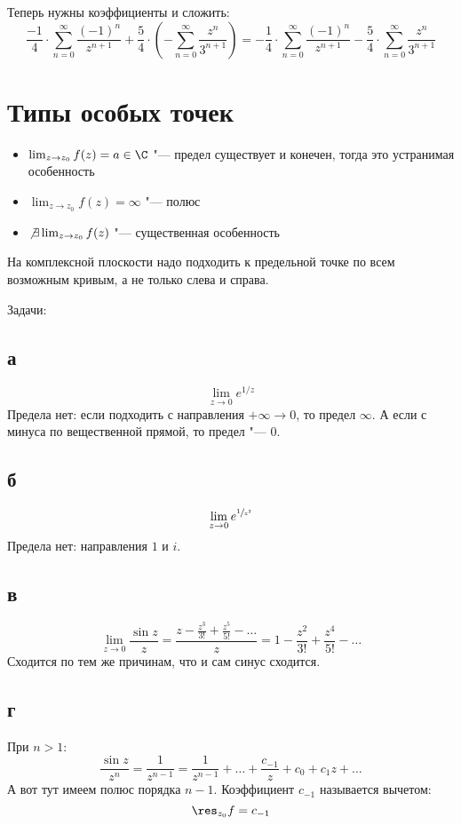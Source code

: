 	Теперь нужны коэффициенты и сложить:
	\[
		\frac{-1}{4} \cdot \sum_{n=0}^\infty \frac{(-1)^n}{z^{n+1}}
		+
		\frac{5}{4} \cdot \left(-\sum_{n=0}^\infty \frac{z^n}{3^{n+1}}\right) =
		- \frac{1}{4} \cdot \sum_{n=0}^\infty \frac{(-1)^n}{z^{n+1}}
		- \frac{5}{4} \cdot \sum_{n=0}^\infty \frac{z^n}{3^{n+1}}
	\]

\section{Типы особых точек}
	\begin{itemize}
		\item
			$\lim_{z\to z_0} f(z) = a \in \C$ "--- предел существует и конечен, тогда это устранимая особенность
		\item
			$\lim_{z\to z_0} f(z) = \infty$ "--- полюс
		\item
			$\not\exists \lim_{z\to z_0} f(z)$ "--- существенная особенность
	\end{itemize}

	\begin{Rem}
		На комплексной плоскости надо подходить к предельной точке по всем возможным кривым,
		а не только слева и справа.
	\end{Rem}

	Задачи:
	\subsection{а}
		\[
			\lim_{z\to 0} e^{1/z}
		\]
		Предела нет: если подходить с направления $+\infty \to 0$, то предел $\infty$.
		А если с минуса по вещественной прямой, то предел "--- $0$.

	\subsection{б}
		\[
			\lim_{z\to 0} e^{\sfrac{1}{z^2}}
		\]
		Предела нет: направления $1$ и $i$.

	\subsection{в}
		\[
			\lim_{z\to 0} \frac{\sin z}{z} = \frac{z - \frac{z^3}{3!} + \frac{z^5}{5!} - \dots}{z} = 1 - \frac{z^2}{3!} + \frac{z^4}{5!} - \dots
		\]
		Сходится по тем же причинам, что и сам синус сходится.

	\subsection{г}
		При $n>1$:
		\[
			\frac{\sin z}{z^n} = \frac{1}{z^{n-1}} = \frac{1}{z^{n-1}} + \dots + \frac{c_{-1}}{z} + c_0 + c_1z + \dots
		\]
		А вот тут имеем полюс порядка $n-1$.
		Коэффициент $c_{-1}$ называется вычетом:
		\[
			\res_{z_0} f = c_{-1}
		\]

